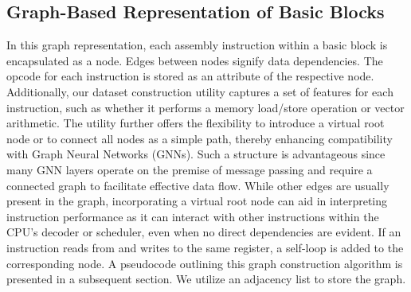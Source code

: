 \subsection{Graph-Based Representation of Basic Blocks}

In this graph representation, each assembly instruction within a basic block is encapsulated as a node. Edges between nodes signify data dependencies. The opcode for each instruction is stored as an attribute of the respective node. Additionally, our dataset construction utility captures a set of features for each instruction, such as whether it performs a memory load/store operation or vector arithmetic. The utility further offers the flexibility to introduce a virtual root node or to connect all nodes as a simple path, thereby enhancing compatibility with Graph Neural Networks (GNNs). Such a structure is advantageous since many GNN layers operate on the premise of message passing and require a connected graph to facilitate effective data flow. While other edges are usually present in the graph, incorporating a virtual root node can aid in interpreting instruction performance as it can interact with other instructions within the CPU's decoder or scheduler, even when no direct dependencies are evident. If an instruction reads from and writes to the same register, a self-loop is added to the corresponding node. A pseudocode outlining this graph construction algorithm is presented in a subsequent section. We utilize an adjacency list to store the graph.

